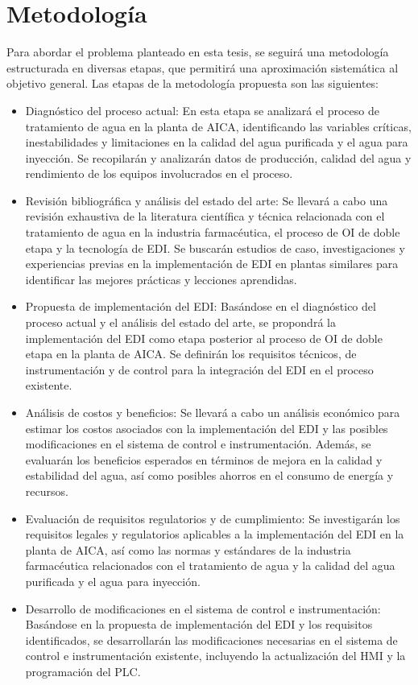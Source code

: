\section{Metodología}
Para abordar el problema planteado en esta tesis, se seguirá una metodología estructurada en diversas etapas, que permitirá una aproximación sistemática al objetivo general. Las etapas de la metodología propuesta son las siguientes:
\begin{itemize}
    \item Diagnóstico del proceso actual: En esta etapa se analizará el proceso de tratamiento de agua en la planta de AICA, identificando las variables críticas, inestabilidades y limitaciones en la calidad del agua purificada y el agua para inyección. Se recopilarán y analizarán datos de producción, calidad del agua y rendimiento de los equipos involucrados en el proceso.
    \item Revisión bibliográfica y análisis del estado del arte: Se llevará a cabo una revisión exhaustiva de la literatura científica y técnica relacionada con el tratamiento de agua en la industria farmacéutica, el proceso de OI de doble etapa y la tecnología de EDI. Se buscarán estudios de caso, investigaciones y experiencias previas en la implementación de EDI en plantas similares para identificar las mejores prácticas y lecciones aprendidas.
    \item Propuesta de implementación del EDI: Basándose en el diagnóstico del proceso actual y el análisis del estado del arte, se propondrá la implementación del EDI como etapa posterior al proceso de OI de doble etapa en la planta de AICA. Se definirán los requisitos técnicos, de instrumentación y de control para la integración del EDI en el proceso existente.
    \item Análisis de costos y beneficios: Se llevará a cabo un análisis económico para estimar los costos asociados con la implementación del EDI y las posibles modificaciones en el sistema de control e instrumentación. Además, se evaluarán los beneficios esperados en términos de mejora en la calidad y estabilidad del agua, así como posibles ahorros en el consumo de energía y recursos.
    \item Evaluación de requisitos regulatorios y de cumplimiento: Se investigarán los requisitos legales y regulatorios aplicables a la implementación del EDI en la planta de AICA, así como las normas y estándares de la industria farmacéutica relacionados con el tratamiento de agua y la calidad del agua purificada y el agua para inyección.
    \item Desarrollo de modificaciones en el sistema de control e instrumentación: Basándose en la propuesta de implementación del EDI y los requisitos identificados, se desarrollarán las modificaciones necesarias en el sistema de control e instrumentación existente, incluyendo la actualización del HMI y la programación del PLC.
\end{itemize}






